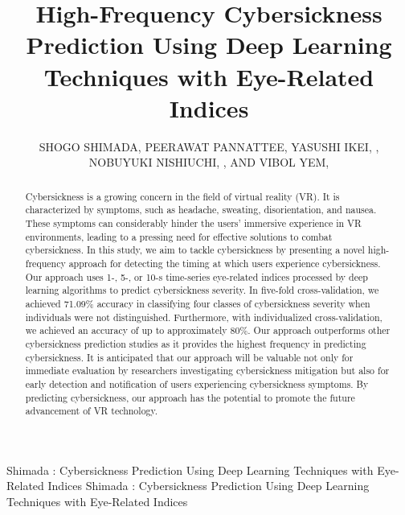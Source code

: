 \documentclass{ieeeaccess}
\begin{document}

\title{High-Frequency Cybersickness Prediction Using Deep Learning Techniques with Eye-Related Indices}

\author{
    \uppercase{Shogo Shimada}, 
    \uppercase{Peerawat Pannattee}, 
    \uppercase{Yasushi Ikei}, , 
    \uppercase{Nobuyuki Nishiuchi}, , 
    \uppercase{And Vibol Yem}, 
}

\address[1]{Graduate School of Systems Design, Tokyo Metropolitan University, Tokyo 191-0065, Japan}
\address[2]{Graduate School of Information Science and Technology, The University of Tokyo, Tokyo 113-8656, Japan}
\address[3]{Graduate School of Science and Technology, Degree Program in Systems and Information Engineering, University of Tsukuba, Ibaraki 305-8573, Japan}

\markboth
{Shimada \headeretal: Cybersickness Prediction Using Deep Learning Techniques with Eye-Related Indices}
{Shimada \headeretal: Cybersickness Prediction Using Deep Learning Techniques with Eye-Related Indices}



\begin{abstract}
Cybersickness is a growing concern in the field of virtual reality (VR). It is characterized by symptoms, such as headache, sweating, disorientation, and nausea. These symptoms can considerably hinder the users’ immersive experience in VR environments, leading to a pressing need for effective solutions to combat cybersickness.
In this study, we aim to tackle cybersickness by presenting a novel high-frequency approach for detecting the timing at which users experience cybersickness. Our approach uses 1-, 5-, or 10-s time-series eye-related indices processed by deep learning algorithms to predict cybersickness severity. In five-fold cross-validation, we achieved 71.09\% accuracy in classifying four classes of cybersickness severity when individuals were not distinguished. Furthermore, with individualized cross-validation, we achieved an accuracy of up to approximately 80\%. Our approach outperforms other cybersickness prediction studies as it provides the highest frequency in predicting cybersickness. It is anticipated that our approach will be valuable not only for immediate evaluation by researchers investigating cybersickness mitigation but also for early detection and notification of users experiencing cybersickness symptoms. By predicting cybersickness, our approach has the potential to promote the future advancement of VR technology.
\end{abstract}
\end{document}
